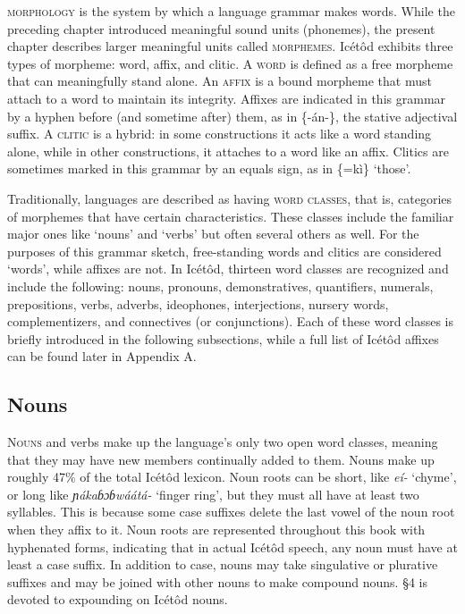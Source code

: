 \textsc{morphology} is the system by which a language grammar makes words. While the preceding chapter introduced meaningful sound units (phonemes), the present chapter describes larger meaningful units called \textsc{morphemes}. Icétôd exhibits three types of morpheme: word, affix, and clitic. A \textsc{word} is defined as a free morpheme that can meaningfully stand alone. An \textsc{affix} is a bound morpheme that must attach to a word to maintain its integrity. Affixes are indicated in this grammar by a hyphen before (and sometime after) them, as in \{-án-\}, the stative adjectival suffix. A \textsc{clitic} is a hybrid: in some constructions it acts like a word standing alone, while in other constructions, it attaches to a word like an affix. Clitics are sometimes marked in this grammar by an equals sign, as in \{=kì\} ‘those’. 

Traditionally, languages are described as having \textsc{word classes}, that is, categories of morphemes that have certain characteristics. These classes include the familiar major ones like ‘nouns’ and ‘verbs’ but often several others as well. For the purposes of this grammar sketch, free-standing words and clitics are considered ‘words’, while affixes are not. In Icétôd, thirteen word classes are recognized and include the following: nouns, pronouns, demonstratives, quantifiers, numerals, prepositions, verbs, adverbs, ideophones, interjections, nursery words, complementizers, and connectives (or conjunctions). Each of these word classes is briefly introduced in the following subsections, while a full list of Icétôd affixes can be found later in Appendix A.
 
\subsection{Nouns}


\textsc{Nouns} and verbs make up the language’s only two open word classes, meaning that they may have new members continually added to them. Nouns make up roughly 47\% of the total Icétôd lexicon. Noun roots can be short, like \textit{eí-} ‘chyme’, or long like \textit{ɲákaɓɔɓwáátá-} ‘finger ring’, but they must all have at least two syllables. This is because some case suffixes delete the last vowel of the noun root when they affix to it. Noun roots are represented throughout this book with hyphenated forms, indicating that in actual Icétôd speech, any noun must have at least a case suffix. In addition to case, nouns may take singulative or plurative suffixes and may be joined with other nouns to make compound nouns. §4 is devoted to expounding on Icétôd nouns.
 
